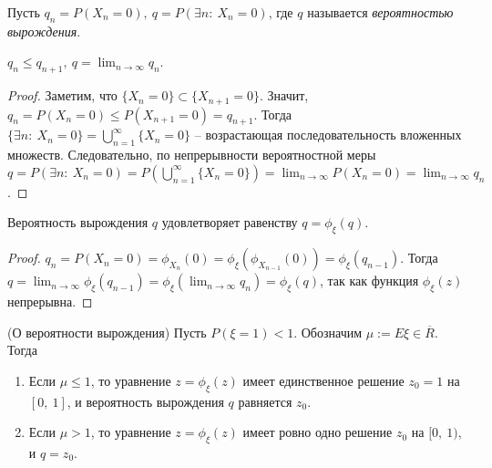 \begin{definition}
Пусть $\displaystyle q_{n} =P( X_{n} =0) ,\ q=P( \exists n:\ X_{n} =0)$, где $\displaystyle q$ называется \textit{вероятностью вырождения}.
\end{definition}
\begin{lemma}
$\displaystyle q_{n} \leqslant q_{n+1} ,\ q=\lim _{n\rightarrow \infty } q_{n}$.
\end{lemma}
\begin{proof}
Заметим, что $\displaystyle \{X_{n} =0\} \subset \{X_{n+1} =0\}$. Значит, $\displaystyle q_{n} =P( X_{n} =0) \leqslant P( X_{n+1} =0) =q_{n+1}$. Тогда $\displaystyle \{\exists n:\ X_{n} =0\} =\bigcup _{n=1}^{\infty }\{X_{n} =0\}$ -- возрастающая последовательность вложенных множеств. Следовательно, по непрерывности вероятностной меры $\displaystyle q=P( \exists n:\ X_{n} =0) =P\left(\bigcup _{n=1}^{\infty }\{X_{n} =0\}\right) =\lim _{n\rightarrow \infty } P( X_{n} =0) =\lim _{n\rightarrow \infty } q_{n}$.
\end{proof}
\begin{lemma}
Вероятность вырождения $\displaystyle q$ удовлетворяет равенству $\displaystyle q=\phi _{\xi }( q)$.
\end{lemma}
\begin{proof}
$\displaystyle q_{n} =P( X_{n} =0) =\phi _{X_{n}}( 0) =\phi _{\xi }( \phi _{X_{n-1}}( 0)) =\phi _{\xi }( q_{n-1})$. Тогда $\displaystyle q=\lim _{n\rightarrow \infty } \phi _{\xi }( q_{n-1}) =\phi _{\xi }\left(\lim _{n\rightarrow \infty } q_{n}\right) =\phi _{\xi }( q)$, так как функция $\displaystyle \phi _{\xi }( z)$ непрерывна.
\end{proof}
\begin{theorem}
(О вероятности вырождения) Пусть $\displaystyle P( \xi =1) < 1$. Обозначим $\displaystyle \mu :=E\xi \in \overline{R}$. Тогда
\begin{enumerate}
    \item Если $\displaystyle \mu \leqslant 1$, то уравнение $\displaystyle z=\phi _{\xi }( z)$ имеет единственное решение $\displaystyle z_{0} =1$ на $\displaystyle [ 0,\ 1]$, и вероятность вырождения $\displaystyle q$ равняется $\displaystyle z_{0}$.
    \item Если $\displaystyle \mu  >1$, то уравнение $\displaystyle z=\phi _{\xi }( z)$ имеет ровно одно решение $\displaystyle z_{0}$ на $\displaystyle [ 0,\ 1)$, и $\displaystyle q=z_{0}$.
\end{enumerate}
\end{theorem}
